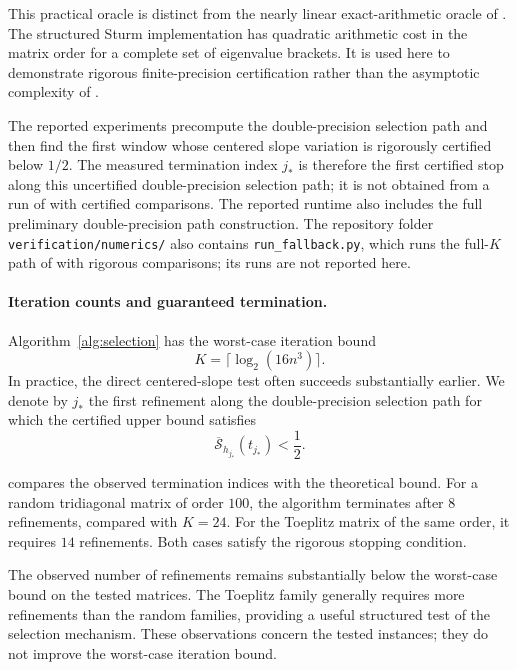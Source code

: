 \documentclass[10pt,a4paper]{article}
\begin{document}
This practical oracle is distinct from the nearly linear
exact-arithmetic oracle of . The structured Sturm
implementation has quadratic arithmetic cost in the matrix order
for a complete set of eigenvalue brackets. It is used here to
demonstrate rigorous finite-precision certification rather than
the asymptotic complexity of .

The reported experiments precompute the double-precision selection
path and then find the first window whose centered slope variation
is rigorously certified below $1/2$. The measured termination index
$j_*$ is therefore the first certified stop along this uncertified
double-precision selection path; it is not obtained from a run of
 with certified comparisons. The reported runtime also includes the full preliminary
double-precision path construction. The repository folder
\texttt{verification/numerics/} also contains
\texttt{run\_fallback.py}, which runs the full-$K$ path of
 with rigorous comparisons; its runs are
not reported here.


\paragraph{Iteration counts and guaranteed termination.}
\label{subsec:numerical-iterations}

Algorithm~\ref{alg:selection} has the worst-case iteration bound
\[
K=\lceil\log_2(16n^3)\rceil.
\]
In practice, the direct centered-slope test often succeeds
substantially earlier. We denote by $j_*$ the first refinement
along the double-precision selection path for which the
certified upper bound satisfies
\[
\overline{\mathcal S}_{h_{j_*}}(t_{j_*})<\frac12.
\]

 compares the observed termination
indices with the theoretical bound. For a random tridiagonal
matrix of order $100$, the algorithm terminates after $8$
refinements, compared with $K=24$. For the Toeplitz matrix
of the same order, it requires $14$ refinements. Both cases
satisfy the rigorous stopping condition.

The observed number of refinements remains substantially
below the worst-case bound on the tested matrices. The Toeplitz
family generally requires more refinements than the random
families, providing a useful structured test of the selection
mechanism. These observations concern the tested instances;
they do not improve the worst-case iteration bound.
\end{document}
